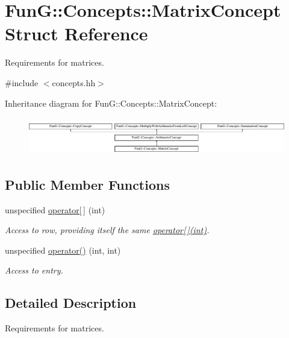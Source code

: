 \hypertarget{structFunG_1_1Concepts_1_1MatrixConcept}{}\section{Fun\+G\+:\+:Concepts\+:\+:Matrix\+Concept Struct Reference}
\label{structFunG_1_1Concepts_1_1MatrixConcept}


Requirements for matrices.  




{\ttfamily \#include $<$concepts.\+hh$>$}

Inheritance diagram for Fun\+G\+:\+:Concepts\+:\+:Matrix\+Concept\+:\begin{figure}[H]
\begin{center}
\leavevmode
\includegraphics[height=1.661721cm]{structFunG_1_1Concepts_1_1MatrixConcept}
\end{center}
\end{figure}
\subsection*{Public Member Functions}
\begin{DoxyCompactItemize}
\item 
unspecified \hyperlink{structFunG_1_1Concepts_1_1MatrixConcept_ad5d89a552a4dc01fc0d06170cca8f00c}{operator\mbox{[}$\,$\mbox{]}} (int)
\begin{DoxyCompactList}\small\item\em Access to row, providing itself the same \hyperlink{structFunG_1_1Concepts_1_1MatrixConcept_ad5d89a552a4dc01fc0d06170cca8f00c}{operator\mbox{[}$\,$\mbox{]}(int)}. \end{DoxyCompactList}\item 
unspecified \hyperlink{structFunG_1_1Concepts_1_1MatrixConcept_a9a7fc91f16e1ddc5801c37f2bfd1bf47}{operator()} (int, int)
\begin{DoxyCompactList}\small\item\em Access to entry. \end{DoxyCompactList}\end{DoxyCompactItemize}


\subsection{Detailed Description}
Requirements for matrices. 

